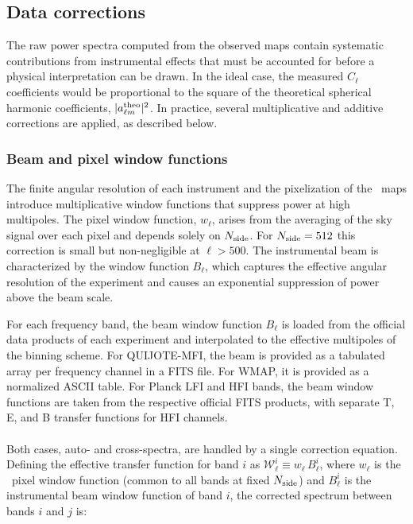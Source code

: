 \subsection{Data corrections}
\label{sec:corrections}

The raw power spectra computed from the observed maps contain systematic contributions from instrumental effects that must be accounted for before a physical interpretation can be drawn. In the ideal case, the measured $C_\ell$ coefficients would be proportional to the square of the theoretical spherical harmonic coefficients, $|a_{\ell m}^{\rm theo}|^2$. In practice, several multiplicative and additive corrections are applied, as described below.

\subsubsection{Beam and pixel window functions}
\label{sec:beam_correction}

The finite angular resolution of each instrument and the pixelization of the \healpix\ maps \citep{Gorski_2005} introduce multiplicative window functions that suppress power at high multipoles. The pixel window function, $w_\ell$, arises from the averaging of the sky signal over each pixel and depends solely on $N_{\rm side}$. For $N_{\rm side} = 512$ this correction is small but non-negligible at $\ell > 500$. The instrumental beam is characterized by the window function $B_\ell$, which captures the effective angular resolution of the experiment and causes an exponential suppression of power above the beam scale.

For each frequency band, the beam window function $B_\ell$ is loaded from the official data products of each experiment and interpolated to the effective multipoles of the binning scheme. For QUIJOTE-MFI, the beam is provided as a tabulated array per frequency channel in a FITS file. For WMAP, it is provided as a normalized ASCII table. For Planck LFI and HFI bands, the beam window functions are taken from the respective official FITS products, with separate T, E, and B transfer functions for HFI channels.

\paragraph{}

Both cases, auto- and cross-spectra, are handled by a single correction equation. Defining the effective transfer function for band $i$ as $\mathcal{W}_\ell^i \equiv w_\ell\, B_\ell^i$, where $w_\ell$ is the \healpix\ pixel window function (common to all bands at fixed $N_{\rm side}$) and $B_\ell^i$ is the instrumental beam window function of band $i$, the corrected spectrum between bands $i$ and $j$ is:

